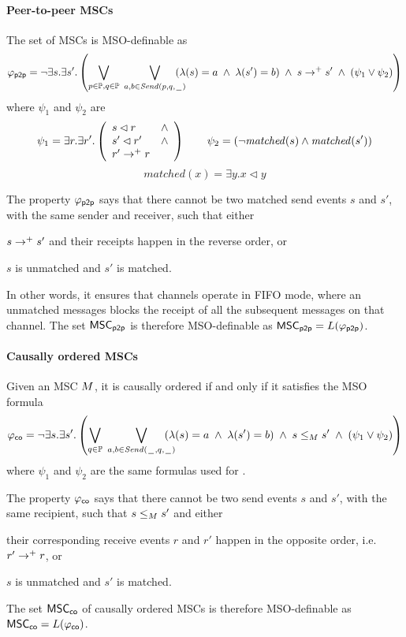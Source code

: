 \documentclass{article}
\begin{document}
\paragraph*{Peer-to-peer MSCs}
	The set of \pp MSCs is MSO-definable as
	\[
		\varphi_{\mathsf{p2p}} = \neg \exists s.\exists s'. \left(
		\bigvee_{\substack{p \in \mathbb{P}, q \in \mathbb{P}}}\;
		\bigvee_{\substack{a,b \in {\mathit{Send}(p,q,\hspace{0.1em}\underline{\hspace{0.5em}}\hspace{0.1em})}}}\hspace{-1em}
		(\lambda(s) = a \;\wedge\; \lambda(s') = b) \;\wedge\; s \to^+ s' \;\wedge\;
		(\psi_1 \vee \psi_2 ) 	
		\right)
	\]
	where $\psi_1$ and $\psi_2$ are
	\[
		\psi_1 = \exists r.\exists r'.\left(
		\begin{array}{ll}
			s \lhd r & \wedge\\
			s' \lhd r' & \wedge\\
			r' \to^+ r &
		\end{array} 
		\right) \quad \quad
		\psi_2 = (\neg \mathit{matched}(s) \wedge \mathit{matched}(s'))
		\]
		\[
		matched(x) = \exists y. x \lhd y
	\]

The property $\varphi_{\mathsf{p2p}}$ says that there cannot be two matched send events $s$ and $s'$, with the same sender and receiver, such that either
\begin{enumerate*}[label={(\roman*)}]
	\item $s \to^+ s'$ and their receipts happen in the reverse order, or
	\item $s$ is unmatched and $s'$ is matched.
\end{enumerate*}
In other words, it ensures that channels operate in FIFO mode, where an unmatched messages blocks the receipt of all the subsequent messages on that channel.
The set $\mathsf{MSC}_{\mathsf{p2p}}$ is therefore MSO-definable as $\mathsf{MSC}_{\mathsf{p2p}}=L(\varphi_{\mathsf{p2p}})$.

\paragraph*{Causally ordered MSCs}
Given an MSC $M$, it is causally ordered if and only if it satisfies the MSO formula
\[
	\varphi_{\mathsf{co}} = \neg \exists s.\exists s'. \left(
	\bigvee_{\substack{q \in \mathbb{P}}}\;
	\bigvee_{\substack{a,b \in {\mathit{Send}(\hspace{0.1em}\underline{\hspace{0.5em}}\hspace{0.1em},q,\hspace{0.1em}\underline{\hspace{0.5em}}\hspace{0.1em})}}}\hspace{-1em}
	(\lambda(s) = a \;\wedge\; \lambda(s') = b) \;\wedge\; s \le_M s' \;\wedge\;
	(\psi_1 \vee \psi_2 ) 	
	\right)
\]
where $\psi_1$ and $\psi_2$ are the same formulas used for \pp.

The property $\varphi_{\mathsf{co}}$ says that there cannot be two send events $s$ and $s'$, with the same recipient, such that $s \le_M s'$ and either
\begin{enumerate*}[label={(\roman*)}]
	\item their corresponding receive events $r$ and $r'$ happen in the opposite order, i.e. $r' \to^+ r$, or
	\item $s$ is unmatched and $s'$ is matched.
\end{enumerate*}
The set $\mathsf{MSC}_{\mathsf{co}}$ of causally ordered MSCs is therefore MSO-definable as $\mathsf{MSC}_{\mathsf{co}}=L(\varphi_{\mathsf{co}})$.
\end{document}
